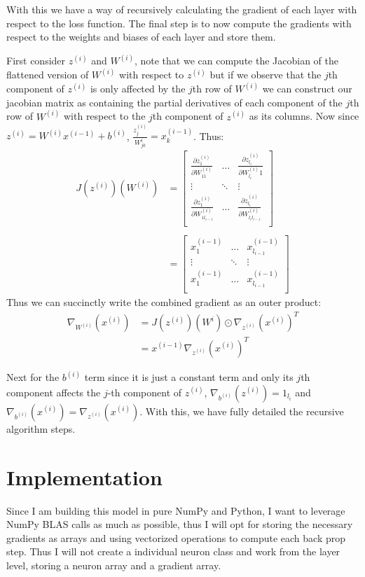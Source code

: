 \documentclass[12pt]{article}
\begin{document}
With this we have a way of recursively calculating the gradient of each layer
with respect to the loss function. The final step is to now compute the gradients with
respect to the weights and biases of each layer and store them.



First consider $z^{(i)}$ and $W^{(i)}$, note that we can compute the Jacobian of the
flattened version of $W^{(i)}$ with respect to $z^{(i)}$ but if we observe that
the $j$th component of $z^{(i)}$ is only affected by the $j$th row of $W^{(i)}$
we can construct our jacobian matrix as containing the partial derivatives of each component of the
$j$th row of $W^{(i)}$ with respect to the $j$th component of $z^{(i)}$ as its columns. Now since
$z^{(i)} = W^{(i)}x^{(i-1)} + b^{(i)}$, $\frac{z^{(i)}_j}{W^{i}_{jk}} = x^{(i-1)}_k$. Thus:
\begin{align*}
    J(z^{(i)})(W^{(i)}) &= \begin{bmatrix}
        \frac{\partial z^{(i)}_1}{\partial W^{(i)}_{11}} & \ldots  & \frac{\partial z^{(i)}_{l_i}}{\partial W^{(i)}_{l_i}1} \\
        \vdots & \ddots & \vdots \\
        \frac{\partial z^{(i)}_1}{\partial W^{(i)}_{1l_{i-1}}} & \ldots  & \frac{\partial z^{(i)}_{l_i}}{\partial W^{(i)}_{l_il_{i-1}}} \\
    \end{bmatrix} \\ \\
    &= \begin{bmatrix}
        x^{(i-1)}_1 & \ldots  & x^{(i-1)}_{l_{i-1}} \\
        \vdots & \ddots & \vdots \\
       x^{(i-1)}_1 & \ldots  & x^{(i-1)}_{l_{i-1}} \\
    \end{bmatrix}
\end{align*}
Thus we can succinctly write the combined gradient as an outer product:
\begin{align*}
    \nabla_{W^{(i)}}(x^{(i)}) &=  J(z^{(i)})(W^{i}) \odot \nabla_{z^{(i)}}(x^{(i)})^T \\
    &= x^{(i-1)}\nabla_{z^{(i)}}(x^{(i)})^T
\end{align*}
 
Next for the $b^{(i)}$ term since it is just a constant term and only its $j$th component affects
the $j$-th component of $z^{(i)}$, $\nabla_{b^{(i)}}(z^{(i)}) = 1_{l_i}$ and
$\nabla_{b^{(i)}}(x^{(i)}) = \nabla_{z^{(i)}}(x^{(i)})$. With this, we have
fully detailed the recursive algorithm steps.

\section*{Implementation}
Since I am building this model in pure NumPy and Python, I want to leverage
NumPy BLAS calls as much as possible, thus I will opt for storing the necessary gradients
as arrays and using vectorized operations to compute each back prop step. Thus
I will not create a individual neuron class and work from the layer level, storing a neuron
array and a gradient array.
\end{document}
